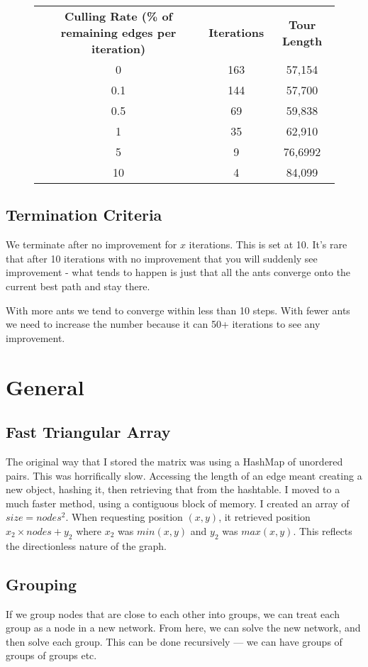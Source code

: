 \documentclass[a4paper, 11pt,table]{article}
\begin{document}
\begin{figure}
	\begin{center}
		\begin{tabu}{|c c c|}
			\textbf{Culling Rate (\% of remaining edges per iteration)} & \textbf{Iterations} & \textbf{Tour Length} \\
			0 & 163 & 57,154 \\
			0.1 & 144 & 57,700 \\
			0.5 & 69 & 59,838 \\
			1 & 35 & 62,910 \\
			5 & 9 & 76,6992 \\
			10 & 4 & 84,099 \\
		\end{tabu}
	\end{center}
\end{figure}
	
	\subsection{Termination Criteria}
	We terminate after no improvement for $x$ iterations. This is set at 10. It's rare that after 10 iterations with no improvement that you will suddenly see improvement - what tends to happen is just that all the ants converge onto the current best path and stay there.
	
	With more ants we tend to converge within less than 10 steps. With fewer ants we need to increase the number because it can 50+ iterations to see any improvement.
	
	\section{General}
	\subsection{Fast Triangular Array}
	The original way that I stored the matrix was using a HashMap of unordered pairs. This was horrifically slow. Accessing the length of an edge meant creating a new object, hashing it, then retrieving that from the hashtable. I moved to a much faster method, using a contiguous block of memory. I created an array of $size=nodes^2$. When requesting position $(x,y)$, it retrieved position $x_2 \times nodes + y_2$ where $x_2$ was $min(x,y)$ and $y_2$ was $max(x,y)$. This reflects the directionless nature of the graph.
	
	\subsection{Grouping}
	If we group nodes that are close to each other into groups, we can treat each group as a node in a new network. From here, we can solve the new network, and then solve each group. This can be done recursively --- we can have groups of groups of groups etc.
	
\end{document}
